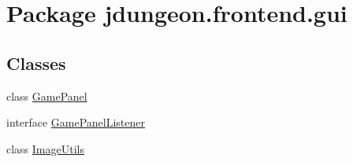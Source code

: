 \hypertarget{namespacejdungeon_1_1frontend_1_1gui}{
\section{Package jdungeon.frontend.gui}
\label{namespacejdungeon_1_1frontend_1_1gui}
}
\subsection*{Classes}
\begin{DoxyCompactItemize}
\item 
class \hyperlink{classjdungeon_1_1frontend_1_1gui_1_1_game_panel}{GamePanel}
\item 
interface \hyperlink{interfacejdungeon_1_1frontend_1_1gui_1_1_game_panel_listener}{GamePanelListener}
\item 
class \hyperlink{classjdungeon_1_1frontend_1_1gui_1_1_image_utils}{ImageUtils}
\end{DoxyCompactItemize}
